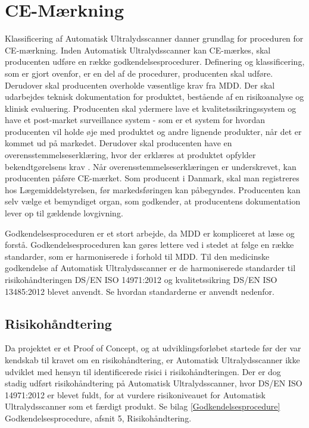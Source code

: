 \section{CE-Mærkning}
Klassificering af Automatisk Ultralydsscanner danner grundlag for proceduren for CE-mærkning. Inden Automatisk Ultralydsscanner kan CE-mærkes, skal producenten udføre en række godkendelsesprocedurer. Definering og klassificering, som er gjort ovenfor, er en del af de procedurer, producenten skal udføre. Derudover skal producenten overholde væsentlige krav fra MDD. Der skal udarbejdes teknisk dokumentation for produktet, bestående af en risikoanalyse og klinisk evaluering. Producenten skal ydermere lave et kvalitetssikringssystem og have et post-market surveillance system - som er et system for hvordan producenten vil holde øje med produktet og andre lignende produkter, når det er kommet ud på markedet. Derudover skal producenten have en overensstemmelseserklæring, hvor der  erklæres at produktet opfylder bekendtgørelsens krav \cite{Vej}. Når overensstemmelseserklæringen er underskrevet, kan producenten påføre CE-mærket. Som producent i Danmark, skal man registreres hos Lægemiddelstyrelsen, før markedsføringen kan påbegyndes. Producenten kan selv vælge et bemyndiget organ, som godkender, at producentens dokumentation lever op til gældende lovgivning. \cite{Klasse} 

Godkendelsesproceduren er et stort arbejde, da MDD er kompliceret at læse og forstå. Godkendelsesproceduren kan gøres lettere ved i stedet at følge en række standarder, som er harmoniserede i forhold til MDD. Til den medicinske godkendelse af Automatisk Ultralydsscanner er de harmoniserede standarder til risikohåndteringen DS/EN ISO 14971:2012 \cite{14971} og kvalitetssikring DS/EN ISO 13485:2012 \cite{13485} blevet anvendt. Se hvordan standarderne er anvendt nedenfor. 

\subsection{Risikohåndtering}
Da projektet er et Proof of Concept, og at udviklingsforløbet startede før der var kendskab til kravet om en risikohåndtering, er Automatisk Ultralydsscanner ikke udviklet med hensyn til identificerede risici i risikohåndteringen. Der er dog stadig udført risikohåndtering på Automatisk Ultralydsscanner, hvor DS/EN ISO 14971:2012 \cite{14971} er blevet fuldt, for at vurdere risikoniveauet for Automatisk Ultralydsscanner som et færdigt produkt. Se bilag \ref{Godkendelsesprocedure} Godkendelsesprocedure, afsnit 5, Risikohåndtering. 

